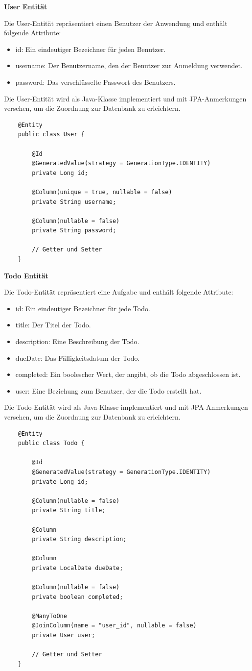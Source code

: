 \textbf{User Entität}

Die User-Entität repräsentiert einen Benutzer der Anwendung und enthält folgende Attribute:

\begin{itemize}
	\item id: Ein eindeutiger Bezeichner für jeden Benutzer.
	\item username: Der Benutzername, den der Benutzer zur Anmeldung verwendet.
	\item password: Das verschlüsselte Passwort des Benutzers.
\end{itemize}

Die User-Entität wird als Java-Klasse implementiert und mit JPA-Anmerkungen versehen, um die Zuordnung zur Datenbank zu erleichtern.

\begin{lstlisting}
	@Entity
	public class User {
		
		@Id
		@GeneratedValue(strategy = GenerationType.IDENTITY)
		private Long id;
		
		@Column(unique = true, nullable = false)
		private String username;
		
		@Column(nullable = false)
		private String password;
		
		// Getter und Setter
	}
\end{lstlisting}
	
\textbf{Todo Entität}

Die Todo-Entität repräsentiert eine Aufgabe und enthält folgende Attribute:

\begin{itemize}
	\item id: Ein eindeutiger Bezeichner für jede Todo.
	\item title:  Der Titel der Todo.
	\item description: Eine Beschreibung der Todo.
	\item dueDate: Das Fälligkeitsdatum der Todo.
	\item completed: Ein boolescher Wert, der angibt, ob die Todo abgeschlossen ist.
	\item user: Eine Beziehung zum Benutzer, der die Todo erstellt hat.
\end{itemize}

Die Todo-Entität wird als Java-Klasse implementiert und mit JPA-Anmerkungen versehen, um die Zuordnung zur Datenbank zu erleichtern.

\begin{lstlisting}
	@Entity
	public class Todo {
		
		@Id
		@GeneratedValue(strategy = GenerationType.IDENTITY)
		private Long id;
		
		@Column(nullable = false)
		private String title;
		
		@Column
		private String description;
		
		@Column
		private LocalDate dueDate;
		
		@Column(nullable = false)
		private boolean completed;
		
		@ManyToOne
		@JoinColumn(name = "user_id", nullable = false)
		private User user;
		
		// Getter und Setter
	}
\end{lstlisting}


